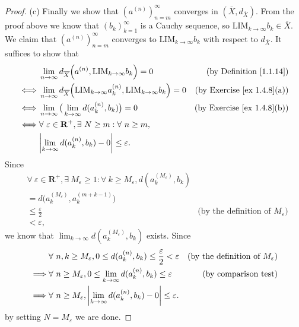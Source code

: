 \begin{proof}{(c)}
    Finally we show that \((a^{(n)})_{n = m}^\infty\) converges in \((\overline{X}, d_{\overline{X}})\).
    From the proof above we know that \((b_k)_{k = 1}^\infty\) is a Cauchy sequence, so \(\text{LIM}_{k \to \infty} b_k \in \overline{X}\).
    We claim that \((a^{(n)})_{n = m}^\infty\) converges to \(\text{LIM}_{k \to \infty} b_k\) with respect to \(d_{\overline{X}}\).
    It suffices to show that
    \begin{align*}
             & \lim_{n \to \infty} d_{\overline{X}}\Big(a^{(n)}, \text{LIM}_{k \to \infty} b_k\Big) = 0                             & \text{(by Definition \ref{1.1.14})}    \\
        \iff & \lim_{n \to \infty} d_{\overline{X}}\Big(\text{LIM}_{k \to \infty} a_k^{(n)}, \text{LIM}_{k \to \infty} b_k\Big) = 0 & \text{(by Exercise \ref{ex 1.4.8}(a))} \\
        \iff & \lim_{n \to \infty} \big(\lim_{k \to \infty} d(a_k^{(n)}, b_k)\big) = 0                                              & \text{(by Exercise \ref{ex 1.4.8}(b))} \\
        \iff & \forall\ \varepsilon \in \mathbf{R}^+, \exists\ N \geq m : \forall\ n \geq m,                                                                                 \\
             & \abs*{\lim_{k \to \infty} d(a_k^{(n)}, b_k) - 0} \leq \varepsilon.
    \end{align*}
    Since
    \begin{align*}
         & \forall\ \varepsilon \in \mathbf{R}^+, \exists\ M_\varepsilon \geq 1 : \forall\ k \geq M_\varepsilon, d(a_k^{(M_\varepsilon)}, b_k)                                                   \\
         & = d\Big(a_k^{(M_\varepsilon)}, a_k^{(m + k - 1)}\Big)                                                                                                                                 \\
         & \leq \frac{\varepsilon}{2}                                                                                                          & \text{(by the definition of \(M_\varepsilon\))} \\
         & < \varepsilon,
    \end{align*}
    we know that \(\lim_{k \to \infty} d(a_k^{(M_\varepsilon)}, b_k)\) exists.
    Since
    \begin{align*}
                 & \forall\ n, k \geq M_\varepsilon, 0 \leq d(a_k^{(n)}, b_k) \leq \frac{\varepsilon}{2} < \varepsilon & \text{(by the definition of \(M_\varepsilon\))} \\
        \implies & \forall\ n \geq M_\varepsilon, 0 \leq \lim_{k \to \infty} d(a_k^{(n)}, b_k) \leq \varepsilon        & \text{(by comparison test)}                     \\
        \implies & \forall\ n \geq M_\varepsilon, \abs*{\lim_{k \to \infty} d(a_k^{(n)}, b_k) - 0} \leq \varepsilon.
    \end{align*}
    by setting \(N = M_\varepsilon\) we are done.
\end{proof}

